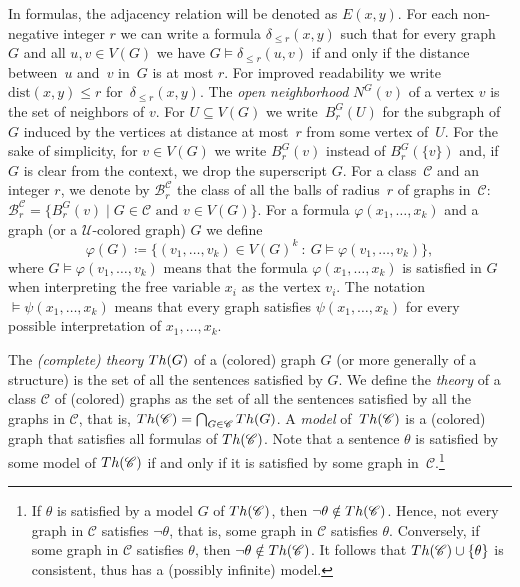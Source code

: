 \documentclass{lmcs}
\newcommand{\Cc}{\mathscr{C}}
\newcommand{\dist}{\mathrm{dist}}
\renewcommand{\phi}{\varphi}
\newcommand{\rloc}[2]{\ensuremath{\mathcal{B}_{#1}^{#2}}}
\newcommand{\Uu}{\mathcal{U}}
\theoremstyle{definition}
\begin{document}
 In formulas, the adjacency relation
will be denoted as $E(x,y)$. For each non-negative integer $r$ we can
write a formula $\delta_{\leq r}(x,y)$ such that for every graph~$G$
and all $u,v\in V(G)$ we have $G\models\delta_{\leq r}(u,v)$ if and
only if the distance between~$u$ and~$v$ in~$G$ is at most $r$. For
improved readability we write $\dist(x,y)\leq r$
for~$\delta_{\leq r}(x,y)$.  The \emph{open neighborhood} 
$N^G(v)$ of a vertex $v$ is the set of neighbors of $v$. 
For $U\subseteq V(G)$ we write~$B_r^G(U)$
for the subgraph of $G$ induced by the vertices at distance at most~$r$ from some vertex of~$U$. For the sake of
simplicity, for $v\in V(G)$ we write $B_r^G(v)$ instead of $B_r^G(\{v\})$ and, if~$G$ is clear from the context, we drop the superscript $G$. For a class~$\Cc$ and an integer $r$, we denote by
$\rloc{r}{\Cc}$ the class of all the balls of radius~$r$ of graphs in~$\Cc$: $ \rloc{r}{\Cc}=\{B_r^G(v)\mid G\in\Cc\text{ and }v\in V(G)\}$.
For a formula $\phi(x_1,\ldots, x_k)$ and a graph (or a
$\Uu$-colored graph) $G$ we define
\[\phi(G)\coloneqq \{(v_1,\ldots, v_k)\in
V(G)^k~:~G\models\phi(v_1,\ldots, v_k)\},\]
where $G\models\phi(v_1,\ldots, v_k)$ means that the formula $\phi(x_1,\dots,x_k)$ is satisfied in $G$ when interpreting the free variable $x_i$ as the vertex $v_i$. The notation $\models\psi(x_1,\dots,x_k)$ means that 
every graph satisfies $\psi(x_1,\dots,x_k)$ for every possible interpretation of $x_1,\dots,x_k$.

The \emph{(complete) theory} ${\rm Th}(G)$ of a (colored) graph $G$ (or more generally of a structure) is the set of all the sentences satisfied by $G$. We define the \emph{theory} of a class $\Cc$ of (colored) graphs as the set of all the sentences satisfied by all the graphs in $\Cc$, that is, ${\rm Th}(\Cc)=\bigcap_{G\in\Cc}{\rm Th}(G)$. A \emph{model} of~${\rm Th}(\Cc)$ is a (colored) graph that satisfies all formulas of ${\rm Th}(\Cc)$. Note that a sentence $\theta$ is satisfied by some model of ${\rm Th}(\Cc)$ if and only if it is satisfied by some graph in~$\Cc$.\footnote{
If $\theta$ is satisfied by a model $G$ of ${\rm Th}(\Cc)$, then $\neg\theta\notin{\rm Th}(\Cc)$. Hence, not every graph in $\Cc$ satisfies $\neg\theta$, that is, some graph in $\Cc$ satisfies $\theta$. Conversely, if some graph in $\Cc$ satisfies $\theta$, then $\neg\theta\notin{\rm Th}(\Cc)$. It follows that ${\rm Th}(\Cc)\cup\{\theta\}$ is consistent, thus has a (possibly infinite) model.}
\end{document}
